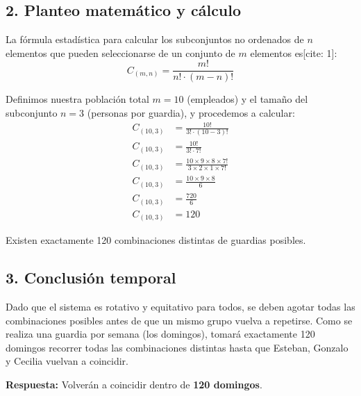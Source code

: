\documentclass[12pt, a4paper]{article}
\begin{document}
\subsection*{2. Planteo matemático y cálculo}
La fórmula estadística para calcular los subconjuntos no ordenados de $n$ elementos que pueden seleccionarse de un conjunto de $m$ elementos es[cite: 1]:
\[ C_{(m,n)} = \frac{m!}{n! \cdot (m-n)!} \]

Definimos nuestra población total $m = 10$ (empleados) y el tamaño del subconjunto $n = 3$ (personas por guardia), y procedemos a calcular:
\begin{align*}
C_{(10,3)} &= \frac{10!}{3! \cdot (10-3)!} \\
C_{(10,3)} &= \frac{10!}{3! \cdot 7!} \\
C_{(10,3)} &= \frac{10 \times 9 \times 8 \times 7!}{3 \times 2 \times 1 \times 7!} \\
C_{(10,3)} &= \frac{10 \times 9 \times 8}{6} \\
C_{(10,3)} &= \frac{720}{6} \\
C_{(10,3)} &= 120
\end{align*}

Existen exactamente 120 combinaciones distintas de guardias posibles.

\subsection*{3. Conclusión temporal}
Dado que el sistema es rotativo y equitativo para todos, se deben agotar todas las combinaciones posibles antes de que un mismo grupo vuelva a repetirse. Como se realiza una guardia por semana (los domingos), tomará exactamente 120 domingos recorrer todas las combinaciones distintas hasta que Esteban, Gonzalo y Cecilia vuelvan a coincidir.

\vspace{0.5cm}

\textbf{Respuesta:} Volverán a coincidir dentro de \textbf{120 domingos}.
\end{document}

